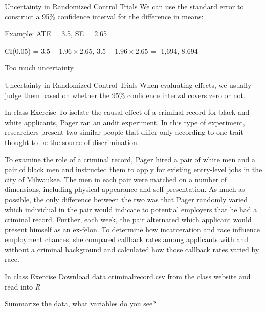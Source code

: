 \documentclass[presentation]{beamer}
\begin{document}
\begin{frame}[label={sec:orgffc4113}]{Uncertainty in Randomized Control Trials}
We can use the standard error to construct a 95\% confidence interval for the difference in means:

Example: ATE = 3.5, SE = 2.65

CI(0.05) = \(3.5 - 1.96 \times 2.65\),  \(3.5 +  1.96 \times 2.65\) = -1,694, 8.694

\alert{Too much uncertainty}
\end{frame}


\begin{frame}[label={sec:org98a77f1}]{Uncertainty in Randomized Control Trials}
When evaluating effects, we usually judge them based on whether the 95\% confidence interval covers zero or not.
\end{frame}


\begin{frame}[shrink=25,label={sec:org042a5a0}]{In class Exercise}
To isolate the causal effect of a criminal record for black and white applicants, Pager ran an audit experiment. In this type of experiment, researchers present two similar people that differ only according to one trait thought to be the source of discrimination.

To examine the role of a criminal record, Pager hired a pair of white men and a pair of black men and instructed them to apply for existing entry-level jobs in the city of Milwaukee. The men in each pair were matched on a number of dimensions, including physical appearance and self-presentation. As much as possible, the only difference between the two was that Pager randomly varied which individual in the pair would indicate to potential employers that he had a criminal record. Further, each week, the pair alternated which applicant would present himself as an ex-felon. To determine how incarceration and race influence employment chances, she compared callback rates among applicants with and without a criminal background and calculated how those callback rates varied by race.
\end{frame}

\begin{frame}[label={sec:org9bf9cbb}]{In class Exercise}
Download data criminalrecord.csv from the class website and read into \emph{R}

Summarize the data, what variables do you see?
\end{frame}
\end{document}
